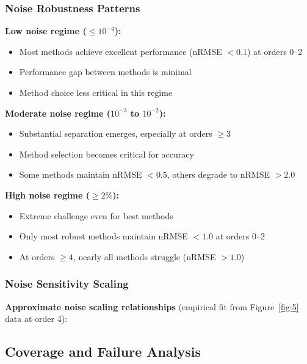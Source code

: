 \subsubsection{Noise Robustness Patterns}

\textbf{Low noise regime ($\leq 10^{-4}$):}
\begin{itemize}
    \item Most methods achieve excellent performance (nRMSE $< 0.1$) at orders 0--2
    \item Performance gap between methods is minimal
    \item Method choice less critical in this regime
\end{itemize}

\textbf{Moderate noise regime ($10^{-3}$ to $10^{-2}$):}
\begin{itemize}
    \item Substantial separation emerges, especially at orders $\geq 3$
    \item Method selection becomes critical for accuracy
    \item Some methods maintain nRMSE $< 0.5$, others degrade to nRMSE $> 2.0$
\end{itemize}

\textbf{High noise regime ($\geq 2\%$):}
\begin{itemize}
    \item Extreme challenge even for best methods
    \item Only most robust methods maintain nRMSE $< 1.0$ at orders 0--2
    \item At orders $\geq 4$, nearly all methods struggle (nRMSE $> 1.0$)
\end{itemize}

\subsubsection{Noise Sensitivity Scaling}

\textbf{Approximate noise scaling relationships} (empirical fit from Figure~\ref{fig:5} data at order 4):


\subsection{Coverage and Failure Analysis}
\label{sec:failures}

